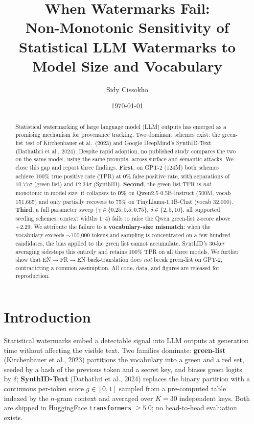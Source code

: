 \documentclass[11pt,a4paper]{article}
\title{\textbf{When Watermarks Fail: \\ Non-Monotonic Sensitivity of Statistical
LLM Watermarks to Model Size and Vocabulary}}
\author{Sidy Cissokho}
\date{\today}
\begin{document}
\maketitle

\begin{abstract}
Statistical watermarking of large language model (LLM) outputs has
emerged as a promising mechanism for provenance tracking. Two dominant
schemes exist: the green-list test of Kirchenbauer et al.\ (2023) and
Google DeepMind's SynthID-Text (Dathathri et al., 2024). Despite rapid
adoption, no published study compares the two on the same model,
using the same prompts, across surface and semantic attacks. We close
this gap and report three findings. \textbf{First}, on GPT-2 (124M)
both schemes achieve 100\% true positive rate (TPR) at 0\% false
positive rate, with separations of $10.77\sigma$ (green-list) and
$12.34\sigma$ (SynthID). \textbf{Second}, the green-list TPR is
\emph{not} monotonic in model size: it collapses to \textbf{0\%} on
Qwen2.5-0.5B-Instruct (500M, vocab 151{,}665) and only partially
recovers to 75\% on TinyLlama-1.1B-Chat (vocab 32{,}000). \textbf{Third},
a full parameter sweep ($\gamma \in \{0.25, 0.5, 0.75\}$,
$\delta \in \{2, 5, 10\}$, all supported seeding schemes, context
widths 1--4) fails to raise the Qwen green-list z-score above
$+2.29$. We attribute the failure to a \textbf{vocabulary-size
mismatch}: when the vocabulary exceeds $\sim$100{,}000 tokens and
sampling is concentrated on a few hundred candidates, the bias applied
to the green list cannot accumulate. SynthID's 30-key averaging
sidesteps this entirely and retains 100\% TPR on all three models. We
further show that EN$\to$FR$\to$EN back-translation does \emph{not}
break green-list on GPT-2, contradicting a common assumption. All code,
data, and figures are released for reproduction.
\end{abstract}

\section{Introduction}
Statistical watermarks embed a detectable signal into LLM outputs at
generation time without affecting the visible text. Two families
dominate: \textbf{green-list} (Kirchenbauer et al., 2023) partitions
the vocabulary into a green and a red set, seeded by a hash of the
previous token and a secret key, and biases green logits by
$\delta$; \textbf{SynthID-Text} (Dathathri et al., 2024) replaces the
binary partition with a continuous per-token score $g \in [0,1]$
sampled from a pre-computed table indexed by the $n$-gram context and
averaged over $K = 30$ independent keys. Both are shipped in
HuggingFace \texttt{transformers} $\geq 5.0$; no head-to-head
evaluation exists.
\end{document}
